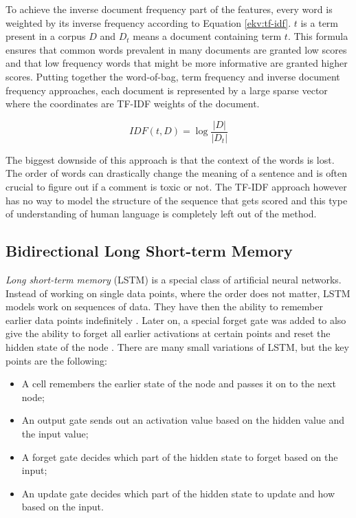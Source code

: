 \documentclass[nofilelist]{cslthse-msc}
\begin{document}
 To achieve the inverse document frequency part of the features, every word is weighted by its inverse frequency according to Equation \ref{ekv:tf-idf}. $t$ is a term present in a corpus $D$ and $D_t$ means a document containing  term $t$. This formula ensures that common words prevalent in many documents are granted low scores and that low frequency words that might be more informative are granted higher scores. Putting together the word-of-bag, term frequency and inverse document frequency approaches, each document is represented by a large sparse vector where the coordinates are TF-IDF weights of the document.

\begin{equation}
    IDF(t, D) = \log{\frac{|D|}{|D_t|}}
    \label{ekv:tf-idf}
\end{equation}


 The biggest downside of this approach is that the context of the words is lost.  The order of words can drastically change the meaning of a sentence and is often crucial to figure out if a comment is toxic or not. The TF-IDF approach however has no way to model the structure of the sequence that gets scored and this type of understanding of human language is completely left out of the method.



\subsection{Bidirectional Long Short-term Memory}

\emph{Long short-term memory} (LSTM) is a special class of artificial neural networks. Instead of working on single data points, where the order does not matter, LSTM models work on sequences of data. They have then the ability to remember earlier data points indefinitely \citep{971021502119971115}. Later on, a special forget gate was added to also give the ability to forget all earlier activations at certain points and reset the hidden state of the node \citep{gers1999learning}. There are many small variations of LSTM, but the key points are the following:

\begin{itemize}
    \item A cell remembers the earlier state of the node and passes it on to the next node;
    \item An output gate sends out an activation value based on the hidden value and the input value;
    \item A forget gate decides which part of the hidden state to forget based on the input;
    \item An update gate decides which part of the hidden state to update and how based on the input.
\end{itemize}
\end{document}
